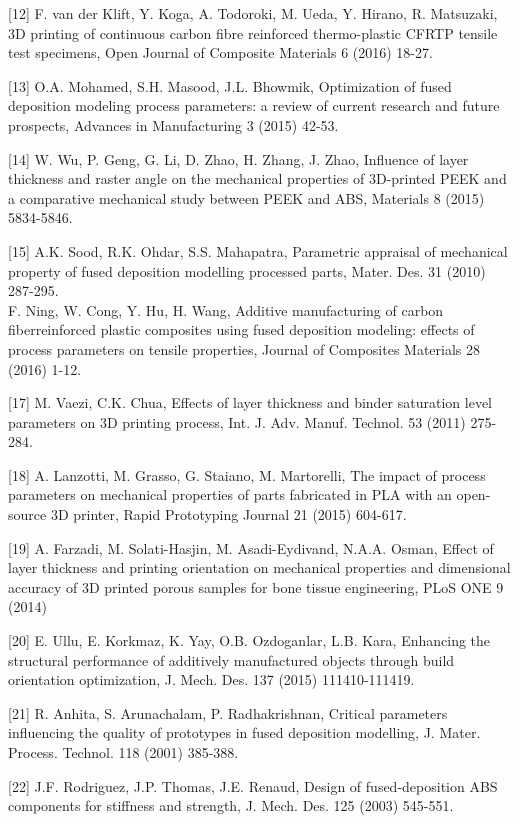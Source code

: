 \documentclass[10pt]{article}
\begin{document}
[12] F. van der Klift, Y. Koga, A. Todoroki, M. Ueda, Y. Hirano, R. Matsuzaki, 3D printing of continuous carbon fibre reinforced thermo-plastic CFRTP tensile test specimens, Open Journal of Composite Materials 6 (2016) 18-27.

[13] O.A. Mohamed, S.H. Masood, J.L. Bhowmik, Optimization of fused deposition modeling process parameters: a review of current research and future prospects, Advances in Manufacturing 3 (2015) 42-53.

[14] W. Wu, P. Geng, G. Li, D. Zhao, H. Zhang, J. Zhao, Influence of layer thickness and raster angle on the mechanical properties of 3D-printed PEEK and a comparative mechanical study between PEEK and ABS, Materials 8 (2015) 5834-5846.

[15] A.K. Sood, R.K. Ohdar, S.S. Mahapatra, Parametric appraisal of mechanical property of fused deposition modelling processed parts, Mater. Des. 31 (2010) 287-295.\\
[16] F. Ning, W. Cong, Y. Hu, H. Wang, Additive manufacturing of carbon fiberreinforced plastic composites using fused deposition modeling: effects of process parameters on tensile properties, Journal of Composites Materials 28 (2016) 1-12.

[17] M. Vaezi, C.K. Chua, Effects of layer thickness and binder saturation level parameters on 3D printing process, Int. J. Adv. Manuf. Technol. 53 (2011) 275-284.

[18] A. Lanzotti, M. Grasso, G. Staiano, M. Martorelli, The impact of process parameters on mechanical properties of parts fabricated in PLA with an open-source 3D printer, Rapid Prototyping Journal 21 (2015) 604-617.

[19] A. Farzadi, M. Solati-Hasjin, M. Asadi-Eydivand, N.A.A. Osman, Effect of layer thickness and printing orientation on mechanical properties and dimensional accuracy of 3D printed porous samples for bone tissue engineering, PLoS ONE 9 (2014)

[20] E. Ullu, E. Korkmaz, K. Yay, O.B. Ozdoganlar, L.B. Kara, Enhancing the structural performance of additively manufactured objects through build orientation optimization, J. Mech. Des. 137 (2015) 111410-111419.

[21] R. Anhita, S. Arunachalam, P. Radhakrishnan, Critical parameters influencing the quality of prototypes in fused deposition modelling, J. Mater. Process. Technol. 118 (2001) 385-388.

[22] J.F. Rodriguez, J.P. Thomas, J.E. Renaud, Design of fused-deposition ABS components for stiffness and strength, J. Mech. Des. 125 (2003) 545-551.
\end{document}
